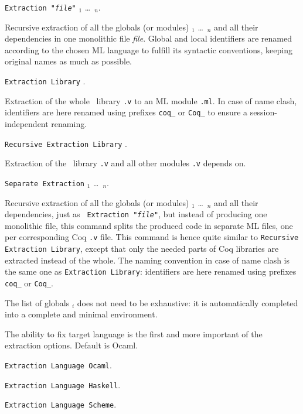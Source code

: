 \begin{description}
\item {\tt Extraction "{\em file}"}  
      \qualid$_1$ \dots\ \qualid$_n$. ~\par
  Recursive extraction of all the globals (or modules) \qualid$_1$ \dots\
  \qualid$_n$ and all their dependencies in one monolithic file {\em file}.
  Global and local identifiers are renamed according to the chosen ML
  language to fulfill its syntactic conventions, keeping original
  names as much as possible.
  
\item {\tt Extraction Library} \ident. ~\par 
  Extraction of the whole \Coq\ library {\tt\ident.v} to an ML module
  {\tt\ident.ml}.  In case of name clash, identifiers are here renamed
  using prefixes \verb!coq_!  or \verb!Coq_! to ensure a
  session-independent renaming.

\item {\tt Recursive Extraction Library} \ident. ~\par
  Extraction of the \Coq\ library {\tt\ident.v} and all other modules 
  {\tt\ident.v} depends on. 

\item {\tt Separate Extraction}
      \qualid$_1$ \dots\ \qualid$_n$. ~\par
  Recursive extraction of all the globals (or modules) \qualid$_1$ \dots\
  \qualid$_n$ and all their dependencies, just as {\tt
    Extraction "{\em file}"}, but instead of producing one monolithic
  file, this command splits the produced code in separate ML files, one per
  corresponding Coq {\tt .v} file. This command is hence quite similar
  to {\tt Recursive Extraction Library}, except that only the needed
  parts of Coq libraries are extracted instead of the whole. The
  naming convention in case of name clash is the same one as
  {\tt Extraction Library}: identifiers are here renamed
  using prefixes \verb!coq_!  or \verb!Coq_!.
\end{description}

The list of globals \qualid$_i$ does not need to be
exhaustive: it is automatically completed into a complete and minimal
environment. 



The ability to fix target language is the first and more important
of the extraction options. Default is Ocaml.
\begin{description}
\item {\tt Extraction Language Ocaml}.
\item {\tt Extraction Language Haskell}.
\item {\tt Extraction Language Scheme}.
\end{description}

